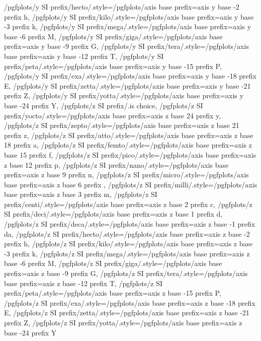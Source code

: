 {    /pgfplots/y SI prefix/hecto/.style={/pgfplots/axis base prefix={axis y base -2 prefix h}},%
    /pgfplots/y SI prefix/kilo/.style={/pgfplots/axis base prefix={axis y base -3 prefix k}},%
    /pgfplots/y SI prefix/mega/.style={/pgfplots/axis base prefix={axis y base -6 prefix M}},%
    /pgfplots/y SI prefix/giga/.style={/pgfplots/axis base prefix={axis y base -9 prefix G}},%
    /pgfplots/y SI prefix/tera/.style={/pgfplots/axis base prefix={axis y base -12 prefix T}},%
    /pgfplots/y SI prefix/peta/.style={/pgfplots/axis base prefix={axis y base -15 prefix P}},%
    /pgfplots/y SI prefix/exa/.style={/pgfplots/axis base prefix={axis y base -18 prefix E}},%
    /pgfplots/y SI prefix/zetta/.style={/pgfplots/axis base prefix={axis y base -21 prefix Z}},%
    /pgfplots/y SI prefix/yotta/.style={/pgfplots/axis base prefix={axis y base -24 prefix Y}},%
    /pgfplots/z SI prefix/.is choice,%
    /pgfplots/z SI prefix/yocto/.style={/pgfplots/axis base prefix={axis z base 24 prefix y}},%
    /pgfplots/z SI prefix/zepto/.style={/pgfplots/axis base prefix={axis z base 21 prefix z}},%
    /pgfplots/z SI prefix/atto/.style={/pgfplots/axis base prefix={axis z base 18 prefix a}},%
    /pgfplots/z SI prefix/femto/.style={/pgfplots/axis base prefix={axis z base 15 prefix f}},%
    /pgfplots/z SI prefix/pico/.style={/pgfplots/axis base prefix={axis z base 12 prefix p}},%
    /pgfplots/z SI prefix/nano/.style={/pgfplots/axis base prefix={axis z base 9 prefix n}},%
    /pgfplots/z SI prefix/micro/.style={/pgfplots/axis base prefix={axis z base 6 prefix \mu}},%
    /pgfplots/z SI prefix/milli/.style={/pgfplots/axis base prefix={axis z base 3 prefix m}},%
    /pgfplots/z SI prefix/centi/.style={/pgfplots/axis base prefix={axis z base 2 prefix c}},%
    /pgfplots/z SI prefix/deci/.style={/pgfplots/axis base prefix={axis z base 1 prefix d}},%
    /pgfplots/z SI prefix/deca/.style={/pgfplots/axis base prefix={axis z base -1 prefix da}},%
    /pgfplots/z SI prefix/hecto/.style={/pgfplots/axis base prefix={axis z base -2 prefix h}},%
    /pgfplots/z SI prefix/kilo/.style={/pgfplots/axis base prefix={axis z base -3 prefix k}},%
    /pgfplots/z SI prefix/mega/.style={/pgfplots/axis base prefix={axis z base -6 prefix M}},%
    /pgfplots/z SI prefix/giga/.style={/pgfplots/axis base prefix={axis z base -9 prefix G}},%
    /pgfplots/z SI prefix/tera/.style={/pgfplots/axis base prefix={axis z base -12 prefix T}},%
    /pgfplots/z SI prefix/peta/.style={/pgfplots/axis base prefix={axis z base -15 prefix P}},%
    /pgfplots/z SI prefix/exa/.style={/pgfplots/axis base prefix={axis z base -18 prefix E}},%
    /pgfplots/z SI prefix/zetta/.style={/pgfplots/axis base prefix={axis z base -21 prefix Z}},%
    /pgfplots/z SI prefix/yotta/.style={/pgfplots/axis base prefix={axis z base -24 prefix Y}}%
}
%
%
\def\pgfplots@label@units#1{%
    \pgfkeysgetvalue{/pgfplots/#1label}{\pgfplots@loc@TMPa}%
    \pgfplots@loc@TMPa\space\pgfplots@label@units@@{#1}%
}

